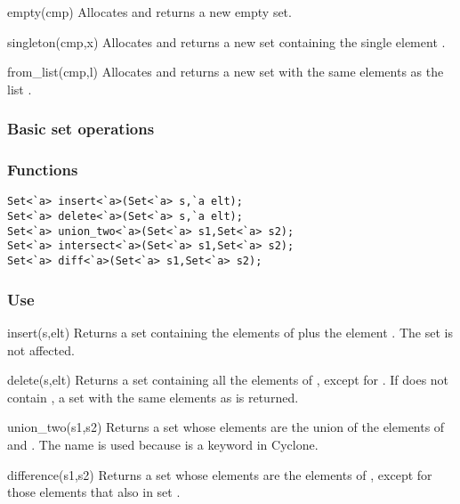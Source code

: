 \begin{defun}{empty}{(cmp)}
Allocates and returns a new empty set.
\end{defun}

\begin{defun}{singleton}{(cmp,x)}
Allocates and returns a new set containing the single element .
\end{defun}

\begin{defun}{from_list}{(cmp,l)}
Allocates and returns a new set with the same elements as the list
.
\end{defun}

\subsubsection*{Basic set operations}
\subsubsection*{Functions}
\begin{verbatim}
Set<`a> insert<`a>(Set<`a> s,`a elt);
Set<`a> delete<`a>(Set<`a> s,`a elt);
Set<`a> union_two<`a>(Set<`a> s1,Set<`a> s2);
Set<`a> intersect<`a>(Set<`a> s1,Set<`a> s2);
Set<`a> diff<`a>(Set<`a> s1,Set<`a> s2);
\end{verbatim}

\subsubsection*{Use}

\begin{defun}{insert}{(s,elt)}
Returns a set containing the elements of  plus the element
.  The set  is not affected.
\end{defun}

\begin{defun}{delete}{(s,elt)}
Returns a set containing all the elements of , except for
.  If  does not contain , a set with the same
elements as  is returned.
\end{defun}

\begin{defun}{union_two}{(s1,s2)}
Returns a set whose elements are the union of the elements of 
and .  The name  is used because  is
a keyword in Cyclone.
\end{defun}

\begin{defun}{difference}{(s1,s2)}
Returns a set whose elements are the elements of , except for
those elements that also in set .
\end{defun}

